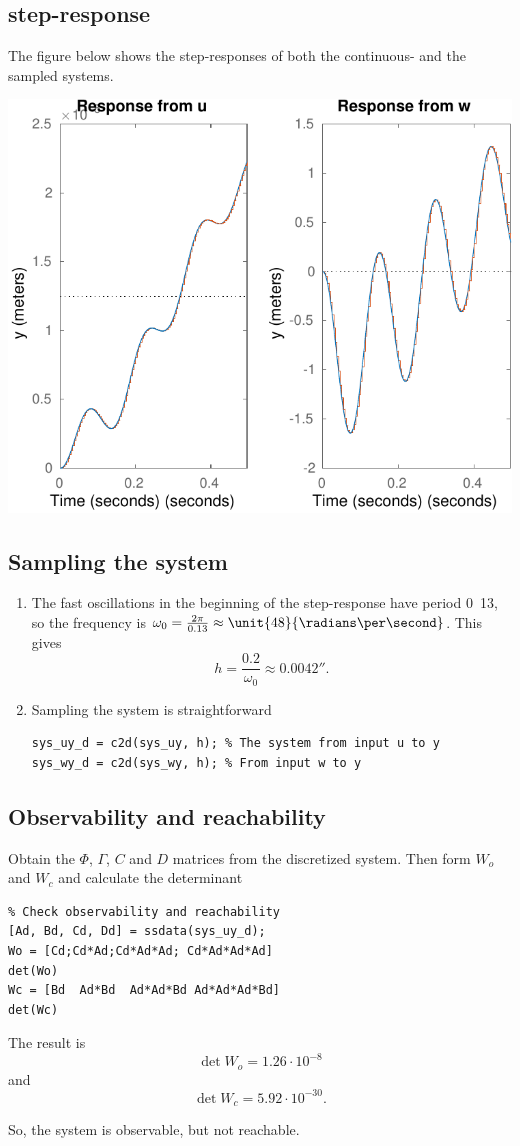 \documentclass{scrartcl}
\begin{document}
\subsection*{step-response}
\label{sec:orgheadline7}
The figure below shows the step-responses of both the continuous- and the sampled systems.
\begin{center}
\includegraphics[width=0.6\linewidth]{active-susp-plant-response}
\end{center}

\subsection*{Sampling the system}
\label{sec:orgheadline8}
\begin{enumerate}
\item The fast oscillations in the beginning of the step-response have period \unit{0.13}{\second},  so the frequency is \(\omega_0 = \frac{2\pi}{0.13}\approx \unit{48}{\radians\per\second}\). This gives 
\[ h = \frac{0.2}{\omega_0} \approx \unit{0.0042}{\second}. \]
\item Sampling the system is straightforward 
\begin{verbatim}
sys_uy_d = c2d(sys_uy, h); % The system from input u to y
sys_wy_d = c2d(sys_wy, h); % From input w to y
\end{verbatim}
\end{enumerate}

\subsection*{Observability and reachability}
\label{sec:orgheadline9}
Obtain the \(\Phi\), \(\Gamma\), \(C\) and \(D\) matrices from the discretized system. Then form \(W_o\) and \(W_c\) and calculate the determinant
\begin{verbatim}
% Check observability and reachability
[Ad, Bd, Cd, Dd] = ssdata(sys_uy_d); 
Wo = [Cd;Cd*Ad;Cd*Ad*Ad; Cd*Ad*Ad*Ad]
det(Wo)
Wc = [Bd  Ad*Bd  Ad*Ad*Bd Ad*Ad*Ad*Bd]
det(Wc)
\end{verbatim}
The result is
\[ \det W_o = 1.26 \cdot 10^{-8}\]
and
\[ \det W_c = 5.92 \cdot 10^{-30}.\]

So, the system is observable, but not reachable. 
\end{document}
